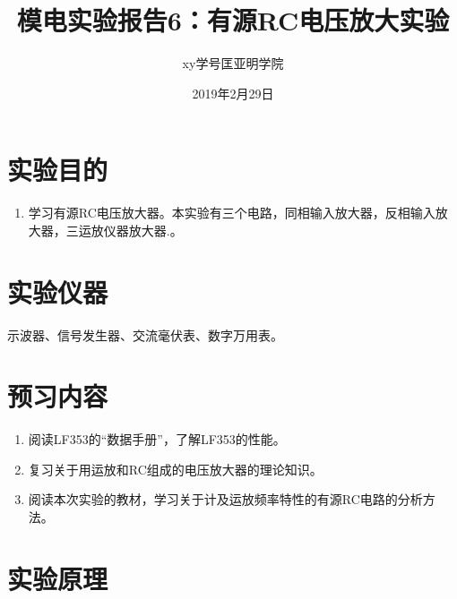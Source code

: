 \documentclass[a4paper]{article}
\title{模电实验报告6：有源RC电压放大实验}
\author{xy\quad 学号\quad 匡亚明学院}
\date{2019年2月29日}
\begin{document}
\maketitle


\section{实验目的}
\begin{enumerate}
\item 学习有源RC电压放大器。本实验有三个电路，同相输入放大器，反相输入放大器，三运放仪器放大器.。
\end{enumerate}

\section{实验仪器}
示波器、信号发生器、交流毫伏表、数字万用表。

\section{预习内容}
\begin{enumerate}
\item 阅读LF353的“数据手册”，了解LF353的性能。
\item 复习关于用运放和RC组成的电压放大器的理论知识。
\item 阅读本次实验的教材，学习关于计及运放频率特性的有源RC电路的分析方法。
\end{enumerate}

\section{实验原理}
\end{document}

